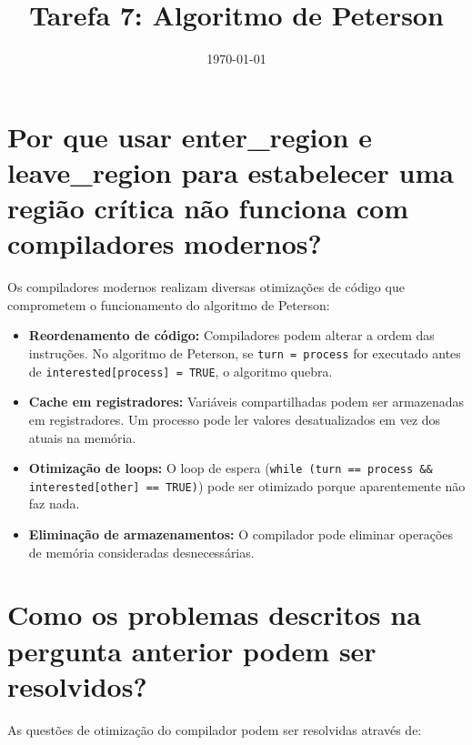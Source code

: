 \documentclass[10pt]{article}
\title{Tarefa 7: Algoritmo de Peterson}
\author{}
\date{\today}
\begin{document}
\maketitle

\section{Por que usar enter\_region e leave\_region para estabelecer uma região crítica não funciona com compiladores modernos?}

Os compiladores modernos realizam diversas otimizações de código que comprometem o funcionamento do algoritmo de Peterson:

\begin{itemize}
    \item \textbf{Reordenamento de código:} Compiladores podem alterar a ordem das instruções. No algoritmo de Peterson, se \texttt{turn = process} for executado antes de \texttt{interested[process] = TRUE}, o algoritmo quebra.

    \item \textbf{Cache em registradores:} Variáveis compartilhadas podem ser armazenadas em registradores. Um processo pode ler valores desatualizados em vez dos atuais na memória.

    \item \textbf{Otimização de loops:} O loop de espera (\texttt{while (turn == process \&\& interested[other] == TRUE)}) pode ser otimizado porque aparentemente não faz nada.

    \item \textbf{Eliminação de armazenamentos:} O compilador pode eliminar operações de memória consideradas desnecessárias.
\end{itemize}

\section{Como os problemas descritos na pergunta anterior podem ser resolvidos?}

As questões de otimização do compilador podem ser resolvidas através de:
\end{document}
